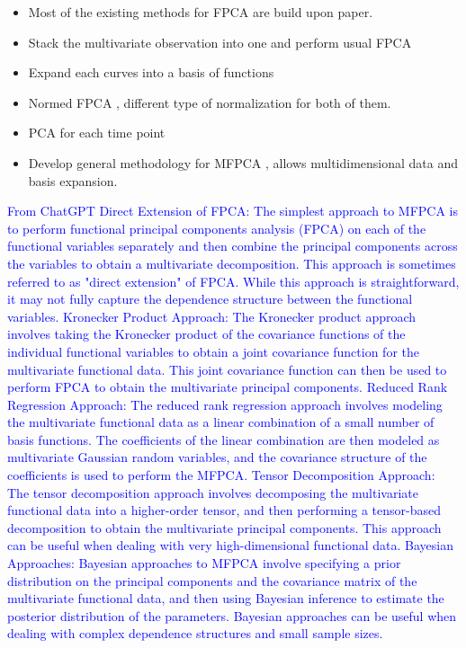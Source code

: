 \begin{itemize}

\item Most of the existing methods for FPCA are build upon \cite{ramsayFunctionalDataAnalysis2005} paper. 

\item Stack the multivariate observation into one and perform usual FPCA \cite{ramsayFunctionalDataAnalysis2005}

\item Expand each curves into a basis of functions \cite{jacquesModelbasedClusteringMultivariate2014a}

\item Normed FPCA \cite{jacquesModelbasedClusteringMultivariate2014a,chiouMultivariateFunctionalPrincipal2014}, different type of normalization for both of them.

\item PCA for each time point \cite{berrenderoPrincipalComponentsMultivariate2011}

\item Develop general methodology for MFPCA \cite{happMultivariateFunctionalPrincipal2015}, allows multidimensional data and basis expansion.
\end{itemize}

\textcolor{blue}{From ChatGPT
Direct Extension of FPCA: The simplest approach to MFPCA is to perform functional principal components analysis (FPCA) on each of the functional variables separately and then combine the principal components across the variables to obtain a multivariate decomposition. This approach is sometimes referred to as "direct extension" of FPCA. While this approach is straightforward, it may not fully capture the dependence structure between the functional variables.
Kronecker Product Approach: The Kronecker product approach involves taking the Kronecker product of the covariance functions of the individual functional variables to obtain a joint covariance function for the multivariate functional data. This joint covariance function can then be used to perform FPCA to obtain the multivariate principal components.
Reduced Rank Regression Approach: The reduced rank regression approach involves modeling the multivariate functional data as a linear combination of a small number of basis functions. The coefficients of the linear combination are then modeled as multivariate Gaussian random variables, and the covariance structure of the coefficients is used to perform the MFPCA.
Tensor Decomposition Approach: The tensor decomposition approach involves decomposing the multivariate functional data into a higher-order tensor, and then performing a tensor-based decomposition to obtain the multivariate principal components. This approach can be useful when dealing with very high-dimensional functional data.
Bayesian Approaches: Bayesian approaches to MFPCA involve specifying a prior distribution on the principal components and the covariance matrix of the multivariate functional data, and then using Bayesian inference to estimate the posterior distribution of the parameters. Bayesian approaches can be useful when dealing with complex dependence structures and small sample sizes.
}


